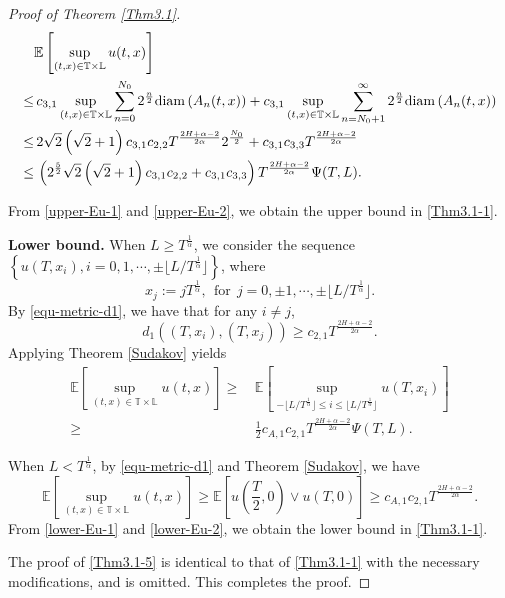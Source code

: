 \documentclass[11pt,reqno]{amsart}
\numberwithin{equation}{section}
\def\EE{\mathbb{E}}
\def\bT{\mathbb{T}}
\def\bL{\mathbb{L}}
\newcommand\diam { {\rm{diam\,}}}
\newcommand{\1}{{\bf 1}}
\newcommand{\2}{{\bf 2}}
\newcommand{\lc}{\left(}
\newcommand{\rc}{\right)}
\newcommand{\lk}{\left[}
\newcommand{\rk}{\right]}
\begin{document}
\begin{proof}[Proof of Theorem \ref{Thm3.1}]
\begin{equation}
\begin{split}
 & \EE \lk\sup_{(t,x)\in\bT\times\bL}u(t,x)\rk\\
  \leq &\,   c_{3,1}\sup_{(t,x)\in\bT\times\bL}\sum_{n=0}^{N_0}2^{\frac{n}{2}}\diam(A_n(t,x))
    +c_{3,1} \sup_{(t,x)\in\bT\times\bL}\sum_{n= N_0+1}^{\infty}2^{\frac{n}{2}} \diam(A_n(t,x)) \\
    \leq& \, 2\sqrt{2}\lc\sqrt{2}+1\rc c_{3,1}c_{2, 2}T^{\frac{2H+\alpha-2}{2\alpha}}2^{\frac{N_0}{2}}
    +c_{3,1}c_{3,3}T^{\frac{2H+\alpha-2}{2\alpha}} \\
  \leq &\, \left(2^{\frac52}\sqrt{2}\lc\sqrt{2}+1\rc c_{3,1}c_{2,2}+c_{3,1}c_{3,3}\right) T^{\frac{2H+\alpha-2}{2\alpha}}\Psi(T, L).
  \end{split}
  \end{equation}

From \eqref{upper-Eu-1} and \eqref{upper-Eu-2}, we obtain the upper bound in \eqref{Thm3.1-1}.


\noindent \textbf{Lower bound.}
 When $L\geq T^{\frac{1}{\alpha}}$, we consider the sequence
$\left\{u(T,x_i),i=0,1,\cdots,\pm \Big\lfloor L/T^{\frac{1}{\alpha}}\Big\rfloor\right\}$, where
  \[
   x_j:=jT^{\frac{1}{\alpha}},\ \ \text{for}\ \ j=0,\pm1,\cdots,\pm\Big\lfloor L/T^{\frac{1}{\alpha}}\Big\rfloor.
  \]
By \eqref{equ-metric-d1}, we have that for any  $i\neq j$,
\[
   d_{1}((T,x_i),(T,x_j))\geq c_{2,1} T^{\frac{2H+\alpha-2}{2\alpha}}.
\]
Applying Theorem \ref{Sudakov}  yields
  \begin{equation}\label{lower-Eu-1}
  \begin{split}
     \EE \lk \sup_{(t,x)\in\bT\times\bL}u(t,x)\rk
     \geq&\, \EE \lk
     \sup_{-\big\lfloor L/T^{\frac{1}{\alpha}}\big\rfloor\le i\le\big\lfloor L/T^{\frac{1}{\alpha}}\big\rfloor}u(T,x_i)\rk\\ 
     \geq &\, \frac12 c_{A,1}c_{2,1} T^{\frac{2H+\alpha-2}{2\alpha}}\Psi(T,L).
  \end{split}
  \end{equation}

When $L< T^{\frac{1}{\alpha}}$, by \eqref{equ-metric-d1} and  Theorem \ref{Sudakov}, we have
\begin{equation}\label{lower-Eu-2}
\EE\lk\sup_{(t,x)\in\bT\times\bL}u(t,x)\rk\geq\EE\left[u\left(\frac{T}{2},0\right)\vee u(T,0)\right]\geq c_{A,1}c_{2,1} T^{\frac{2H+\alpha-2}{2\alpha}}.
\end{equation}
From \eqref{lower-Eu-1} and \eqref{lower-Eu-2}, 
we obtain  the lower bound in  \eqref{Thm3.1-1}.

The proof of \eqref{Thm3.1-5} is identical to that  of   \eqref{Thm3.1-1}  with the necessary modifications, and is omitted. This completes the proof.
\end{proof}
\end{document}
